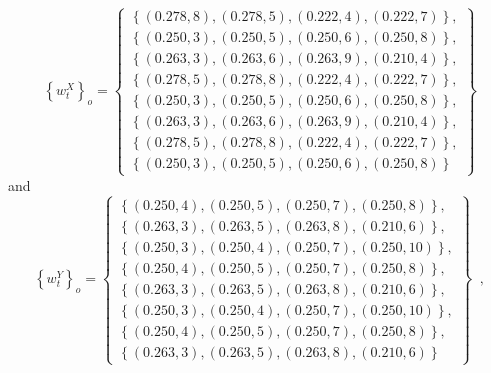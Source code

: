 \begin{equation}
\left\{w_{t}^X\right\}_o = \left\{\begin{array}{c} 
\left\{\left(0.278,8\right),\left(0.278,5\right),\left(0.222,4\right),\left(0.222,7\right)\right\},\\
\left\{\left(0.250,3\right),\left(0.250,5\right),\left(0.250,6\right),\left(0.250,8\right)\right\},\\
\left\{\left(0.263,3\right),\left(0.263,6\right),\left(0.263,9\right),\left(0.210,4\right)\right\},\\
\left\{\left(0.278,5\right),\left(0.278,8\right),\left(0.222,4\right),\left(0.222,7\right)\right\},\\
\left\{\left(0.250,3\right),\left(0.250,5\right),\left(0.250,6\right),\left(0.250,8\right)\right\},\\
\left\{\left(0.263,3\right),\left(0.263,6\right),\left(0.263,9\right),\left(0.210,4\right)\right\},\\
\left\{\left(0.278,5\right),\left(0.278,8\right),\left(0.222,4\right),\left(0.222,7\right)\right\},\\
\left\{\left(0.250,3\right),\left(0.250,5\right),\left(0.250,6\right),\left(0.250,8\right)\right\}
\end{array}\right\}
\end{equation}
and
\begin{equation}
\left\{w_{t}^Y\right\}_o = \left\{\begin{array}{c} 
\left\{\left(0.250,4\right),\left(0.250,5\right),\left(0.250,7\right),\left(0.250,8\right)\right\},\\
\left\{\left(0.263,3\right),\left(0.263,5\right),\left(0.263,8\right),\left(0.210,6\right)\right\},\\
\left\{\left(0.250,3\right),\left(0.250,4\right),\left(0.250,7\right),\left(0.250,10\right)\right\},\\
\left\{\left(0.250,4\right),\left(0.250,5\right),\left(0.250,7\right),\left(0.250,8\right)\right\},\\
\left\{\left(0.263,3\right),\left(0.263,5\right),\left(0.263,8\right),\left(0.210,6\right)\right\},\\
\left\{\left(0.250,3\right),\left(0.250,4\right),\left(0.250,7\right),\left(0.250,10\right)\right\},\\
\left\{\left(0.250,4\right),\left(0.250,5\right),\left(0.250,7\right),\left(0.250,8\right)\right\},\\
\left\{\left(0.263,3\right),\left(0.263,5\right),\left(0.263,8\right),\left(0.210,6\right)\right\}
\end{array}\right\}\;\;,
\end{equation}
